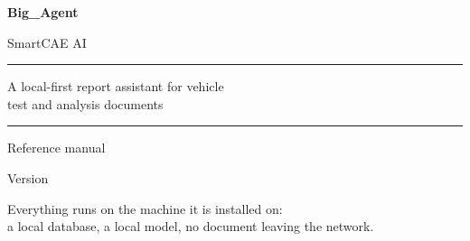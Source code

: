 \documentclass[11pt,a4paper,oneside]{report}
\begin{document}
\begin{titlepage}
\centering
\vspace*{3.5cm}

{\Huge\bfseries Big\_Agent\par}
\vspace{0.8em}
{\Large SmartCAE AI\par}

\vspace{1.6cm}
\rule{0.72\textwidth}{1pt}\par
\vspace{1.2em}
{\large A local-first report assistant for vehicle\\test and analysis documents\par}
\vspace{1.2em}
\rule{0.72\textwidth}{1pt}\par

\vspace{2.4cm}
{\large Reference manual\par}
\vspace{0.6em}
{\large Version \version\par}

\vfill
{\small Everything runs on the machine it is installed on:\\
a local database, a local model, no document leaving the network.\par}
\vspace{1.4cm}
\end{titlepage}

\setcounter{page}{1}
\tableofcontents
\cleardoublepage
{}
\setcounter{page}{1}















\end{document}
